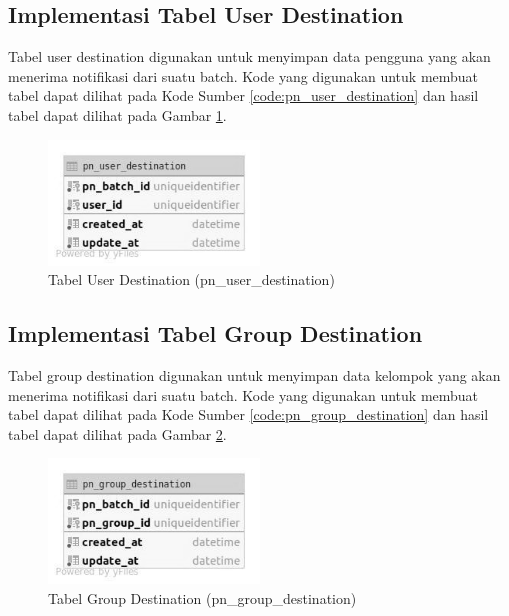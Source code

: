 \subsection{Implementasi Tabel User Destination}
\par Tabel user destination digunakan untuk menyimpan data pengguna yang akan menerima notifikasi dari suatu batch. Kode yang digunakan untuk membuat tabel dapat dilihat pada Kode Sumber \ref{code:pn_user_destination} dan hasil tabel dapat dilihat pada Gambar \ref{tabel_pn_user_destination}.

\begin{figure}[H]
    \centering\includegraphics[width=0.5\textwidth]{bab4/figures/tabel_pn_user_destination.jpg}
    \caption{Tabel User Destination (pn\_user\_destination)}
    \label{tabel_pn_user_destination}
\end{figure}

\subsection{Implementasi Tabel Group Destination}
\par Tabel group destination digunakan untuk menyimpan data kelompok yang akan menerima notifikasi dari suatu batch. Kode yang digunakan untuk membuat tabel dapat dilihat pada Kode Sumber \ref{code:pn_group_destination} dan hasil tabel dapat dilihat pada Gambar \ref{tabel_pn_group_destination}.

\begin{figure}[H]
    \centering\includegraphics[width=0.5\textwidth]{bab4/figures/tabel_pn_group_destination.jpg}
    \caption{Tabel Group Destination (pn\_group\_destination)}
    \label{tabel_pn_group_destination}
\end{figure}

